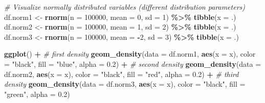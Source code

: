\documentclass[
]{article}
\newenvironment{Shaded}{\begin{snugshade}}{\end{snugshade}}
\newcommand{\AttributeTok}[1]{\textcolor[rgb]{0.13,0.29,0.53}{#1}}
\newcommand{\CommentTok}[1]{\textcolor[rgb]{0.56,0.35,0.01}{\textit{#1}}}
\newcommand{\DecValTok}[1]{\textcolor[rgb]{0.00,0.00,0.81}{#1}}
\newcommand{\FloatTok}[1]{\textcolor[rgb]{0.00,0.00,0.81}{#1}}
\newcommand{\FunctionTok}[1]{\textcolor[rgb]{0.13,0.29,0.53}{\textbf{#1}}}
\newcommand{\NormalTok}[1]{#1}
\newcommand{\OtherTok}[1]{\textcolor[rgb]{0.56,0.35,0.01}{#1}}
\newcommand{\SpecialCharTok}[1]{\textcolor[rgb]{0.81,0.36,0.00}{\textbf{#1}}}
\newcommand{\StringTok}[1]{\textcolor[rgb]{0.31,0.60,0.02}{#1}}
\begin{document}
\begin{Shaded}
\begin{Highlighting}[]
\CommentTok{\#   Visualize normally distributed variables (different distribution parameters)}
\NormalTok{df.norm1 }\OtherTok{\textless{}{-}} \FunctionTok{rnorm}\NormalTok{(}\AttributeTok{n =} \DecValTok{100000}\NormalTok{, }\AttributeTok{mean =} \DecValTok{0}\NormalTok{,  }\AttributeTok{sd =} \DecValTok{1}\NormalTok{) }\SpecialCharTok{\%\textgreater{}\%} \FunctionTok{tibble}\NormalTok{(}\AttributeTok{x =}\NormalTok{ .)}
\NormalTok{df.norm2 }\OtherTok{\textless{}{-}} \FunctionTok{rnorm}\NormalTok{(}\AttributeTok{n =} \DecValTok{100000}\NormalTok{, }\AttributeTok{mean =} \DecValTok{1}\NormalTok{,  }\AttributeTok{sd =} \DecValTok{2}\NormalTok{) }\SpecialCharTok{\%\textgreater{}\%} \FunctionTok{tibble}\NormalTok{(}\AttributeTok{x =}\NormalTok{ .)}
\NormalTok{df.norm3 }\OtherTok{\textless{}{-}} \FunctionTok{rnorm}\NormalTok{(}\AttributeTok{n =} \DecValTok{100000}\NormalTok{, }\AttributeTok{mean =} \SpecialCharTok{{-}}\DecValTok{2}\NormalTok{, }\AttributeTok{sd =} \DecValTok{3}\NormalTok{) }\SpecialCharTok{\%\textgreater{}\%} \FunctionTok{tibble}\NormalTok{(}\AttributeTok{x =}\NormalTok{ .)}

\FunctionTok{ggplot}\NormalTok{() }\SpecialCharTok{+}
  \CommentTok{\# first density}
  \FunctionTok{geom\_density}\NormalTok{(}\AttributeTok{data =}\NormalTok{ df.norm1, }\FunctionTok{aes}\NormalTok{(}\AttributeTok{x =}\NormalTok{ x), }
               \AttributeTok{color =} \StringTok{"black"}\NormalTok{, }\AttributeTok{fill =} \StringTok{"blue"}\NormalTok{, }
               \AttributeTok{alpha =} \FloatTok{0.2}\NormalTok{) }\SpecialCharTok{+}
  \CommentTok{\# second density}
  \FunctionTok{geom\_density}\NormalTok{(}\AttributeTok{data =}\NormalTok{ df.norm2, }\FunctionTok{aes}\NormalTok{(}\AttributeTok{x =}\NormalTok{ x), }
               \AttributeTok{color =} \StringTok{"black"}\NormalTok{, }\AttributeTok{fill =} \StringTok{"red"}\NormalTok{, }
               \AttributeTok{alpha =} \FloatTok{0.2}\NormalTok{) }\SpecialCharTok{+}
  \CommentTok{\# third density}
  \FunctionTok{geom\_density}\NormalTok{(}\AttributeTok{data =}\NormalTok{ df.norm3, }\FunctionTok{aes}\NormalTok{(}\AttributeTok{x =}\NormalTok{ x), }
               \AttributeTok{color =} \StringTok{"black"}\NormalTok{, }\AttributeTok{fill =} \StringTok{"green"}\NormalTok{, }
               \AttributeTok{alpha =} \FloatTok{0.2}\NormalTok{)}
\end{Highlighting}
\end{Shaded}
\end{document}
